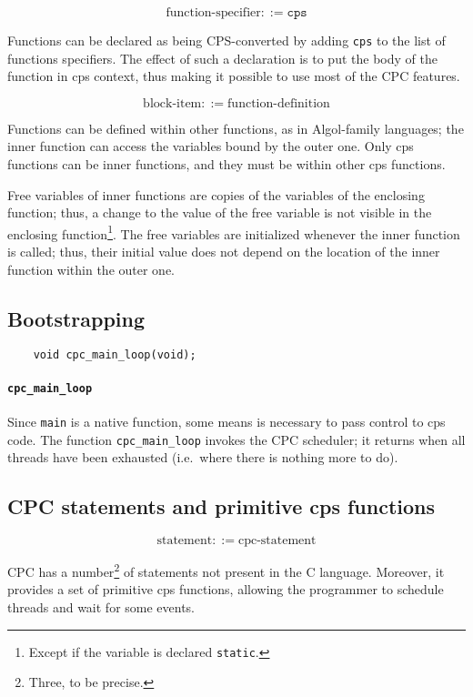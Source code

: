 \documentclass[a4paper]{report}
\begin{document}
\[ \mbox{function-specifier} ::= \mathtt{cps} \]

Functions can be declared as being CPS-converted by adding {\tt cps}
to the list of functions specifiers.  The effect of such a declaration
is to put the body of the function in cps context, thus making it
possible to use most of the CPC features.

\[ \mbox{block-item} ::= \mbox{function-definition} \]

Functions can be defined within other functions, as in Algol-family
languages; the inner function can access the variables bound by the
outer one.  Only cps functions can be inner functions, and they must
be within other cps functions.

Free variables of inner functions are copies of the variables of the
enclosing function; thus, a change to the value of the free variable
is not visible in the enclosing function\footnote{Except if the variable
is declared {\tt static}.}.  The free variables are initialized whenever
the inner function is called; thus, their initial value does not depend
on the location of the inner function within the outer one.

\subsection{Bootstrapping} \label{sec:bootstrapping}

\begin{verbatim}
    void cpc_main_loop(void);
\end{verbatim}

\paragraph{\tt cpc\_main\_loop} Since \verb|main| is a native
function, some means is necessary to pass control to cps code.  The
function \verb|cpc_main_loop| invokes the CPC scheduler; it returns
when all threads have been exhausted (i.e.\ where there is
nothing more to do).

\subsection{CPC statements and primitive cps functions}

\[ \mbox{statement} ::= \mbox{cpc-statement} \]

CPC has a number\footnote{Three, to be precise.} of statements not
present in the C language.  Moreover, it provides a set of primitive cps
functions, allowing the programmer to schedule threads and wait for some
events.
\end{document}
